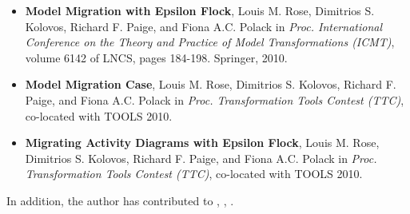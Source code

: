 {\begin{itemize}
		\item \textbf{Model Migration with Epsilon Flock}, Louis M. Rose, Dimitrios S. Kolovos, Richard F. Paige, and Fiona A.C. Polack in \textit{Proc. International Conference on the Theory and Practice of Model Transformations (ICMT)}, volume 6142 of LNCS, pages 184-198. Springer, 2010.
	
		\item \textbf{Model Migration Case}, Louis M. Rose, Dimitrios S. Kolovos, Richard F. Paige, and Fiona A.C. Polack in \textit{Proc. Transformation Tools Contest (TTC)}, co-located with TOOLS 2010.
	
		\item \textbf{Migrating Activity Diagrams with Epsilon Flock}, Louis M. Rose, Dimitrios S. Kolovos, Richard F. Paige, and Fiona A.C. Polack in \textit{Proc. Transformation Tools Contest (TTC)}, co-located with TOOLS 2010.
	\end{itemize}

	In addition, the author has contributed to \cite{kolovos07ewl}, \cite{paige08fptc}, \cite{kolovos10eugenia}.
}